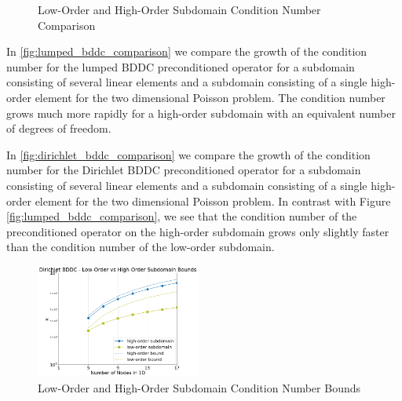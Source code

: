 \documentclass[review]{siamart190516}
\begin{document}
\begin{figure}[!ht]
  \centering
  \hfill
  \caption{Low-Order and High-Order Subdomain Condition Number Comparison}
\end{figure}

In \cref{fig:lumped_bddc_comparison} we compare the growth of the condition number for the lumped BDDC preconditioned operator for a subdomain consisting of several linear elements and a subdomain consisting of a single high-order element for the two dimensional Poisson problem.
The condition number grows much more rapidly for a high-order subdomain with an equivalent number of degrees of freedom.

In \cref{fig:dirichlet_bddc_comparison} we compare the growth of the condition number for the Dirichlet BDDC preconditioned operator for a subdomain consisting of several linear elements and a subdomain consisting of a single high-order element for the two dimensional Poisson problem.
In contrast with Figure \ref{fig:lumped_bddc_comparison}, we see that the condition number of the preconditioned operator on the high-order subdomain grows only slightly faster than the condition number of the low-order subdomain.

\begin{figure}[!ht]
  \centering\includegraphics[width=0.48\textwidth]{img/lowVsHighDirichletBounds}
  \caption{Low-Order and High-Order Subdomain Condition Number Bounds}
  \label{fig:dirichlet_bddc_bounds}
\end{figure}
\end{document}
